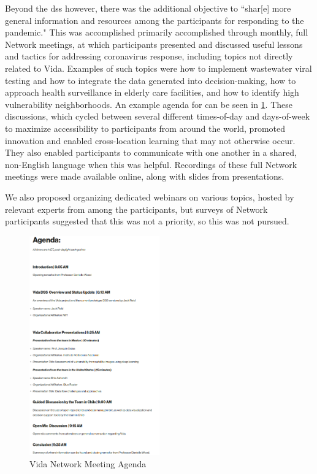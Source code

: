 Beyond the \ac{dss} however, there was the additional objective to ``shar[e] more general information and resources among the participants for responding to the pandemic." This was accomplished primarily accomplished through monthly, full Network meetings, at which participants presented and discussed useful lessons and tactics for addressing coronavirus response, including topics not directly related to Vida. Examples of such topics were how to implement wastewater viral testing and how to integrate the data generated into decision-making, how to approach health surveillance in elderly care facilities, and how to identify high vulnerability neighborhoods. An example agenda for can be seen in \ref{fig:vida-network-agenda}. These discussions, which cycled between several different times-of-day and days-of-week to maximize accessibility to participants from around the world, promoted innovation and enabled cross-location learning that may not otherwise occur. They also enabled participants to communicate with one another in a shared, non-English language when this was helpful. Recordings of these full Network meetings were made available online, along with slides from presentations.

We also proposed organizing dedicated webinars on various topics, hosted by relevant experts from among the participants, but surveys of Network participants suggested that this was not a priority, so this was not pursued. 

\begin{figure}[!htb]
\centering
\includegraphics[width=0.5\textwidth]{Figures/chap5/vida-network-agenda.png}
\caption{Vida Network Meeting Agenda}
\label{fig:vida-network-agenda}
\end{figure}

